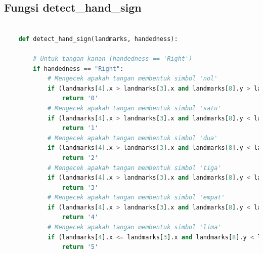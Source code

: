 \documentclass[11pt,a4paper]{article}
\begin{document}
    \subsection{Fungsi detect\_hand\_sign}
    \begin{lstlisting}[language=Python, caption=Fungsi Mendeteksi Landmark Tangan]
    
    def detect_hand_sign(landmarks, handedness):

        # Untuk tangan kanan (handedness == 'Right')
        if handedness == "Right":
            # Mengecek apakah tangan membentuk simbol 'nol'
            if (landmarks[4].x > landmarks[3].x and landmarks[8].y > landmarks[6].y and landmarks[12].y > landmarks[10].y and landmarks[16].y > landmarks[14].y and landmarks[20].y > landmarks[18].y):
                return '0'
            # Mengecek apakah tangan membentuk simbol 'satu'
            if (landmarks[4].x > landmarks[3].x and landmarks[8].y < landmarks[6].y and landmarks[12].y > landmarks[10].y and landmarks[16].y > landmarks[14].y and landmarks[20].y > landmarks[18].y):
                return '1'
            # Mengecek apakah tangan membentuk simbol 'dua'
            if (landmarks[4].x > landmarks[3].x and landmarks[8].y < landmarks[6].y and landmarks[12].y < landmarks[10].y and landmarks[16].y > landmarks[14].y and landmarks[20].y > landmarks[18].y):
                return '2'
            # Mengecek apakah tangan membentuk simbol 'tiga'
            if (landmarks[4].x > landmarks[3].x and landmarks[8].y < landmarks[6].y and landmarks[12].y < landmarks[10].y and landmarks[16].y < landmarks[14].y and landmarks[20].y > landmarks[18].y):
                return '3'
            # Mengecek apakah tangan membentuk simbol 'empat'
            if (landmarks[4].x > landmarks[3].x and landmarks[8].y < landmarks[6].y and landmarks[12].y < landmarks[10].y and landmarks[16].y < landmarks[14].y and landmarks[20].y < landmarks[18].y):
                return '4'
            # Mengecek apakah tangan membentuk simbol 'lima'
            if (landmarks[4].x <= landmarks[3].x and landmarks[8].y < landmarks[6].y and landmarks[12].y < landmarks[10].y and landmarks[16].y < landmarks[14].y and landmarks[20].y < landmarks[18].y):
                return '5'
            

\end{lstlisting}
\end{document}
